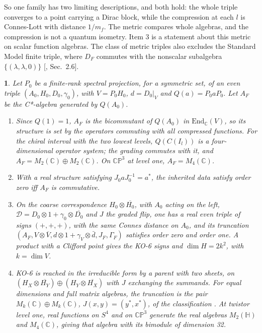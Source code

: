 \documentclass[aps,prd,reprint,onecolumn,nofootinbib,amsmath,amssymb,floatfix]{revtex4-2}
\theoremstyle{plain}
\newcommand{\resultname}{}
\newtheorem*{resultenv}{\resultname}
\newenvironment{result}[1]{\renewcommand{\resultname}{#1}\begin{resultenv}}{\end{resultenv}}
\newcommand{\C}{\mathbb C}
\renewcommand{\H}{\mathbb H}
\begin{document}
So one family has two limiting descriptions, and both hold: the whole triple converges to a point carrying a Dirac block, while the compression at each $l$ is Connes-Lott with distance $1/m_f$. The metric compares whole algebras, and the compression is not a quantum isometry. Item 3 is a statement about this metric on scalar function algebras. The class of metric triples also excludes the Standard Model finite triple, where $D_F$ commutes with the nonscalar subalgebra $\{(\lambda,\lambda,0)\}$ [, Sec.~2.6].

\begin{result}{Proposition H}
Let $P_0$ be a finite-rank spectral projection, for a symmetric set, of an even triple $(A_0,H_0,D_0,\gamma_0)$, with $V=P_0H_0$, $d=D_0|_V$ and $Q(a)=P_0aP_0$. Let $A_F$ be the C*-algebra generated by $Q(A_0)$.
\begin{enumerate}
\item Since $Q(1)=1$, $A_F$ is the bicommutant of $Q(A_0)$ in $\mathrm{End}_\C(V)$, so its structure is set by the operators commuting with all compressed functions. For the chiral interval with the two lowest levels, $Q(C(I_l))$ is a four-dimensional operator system; the grading commutes with it, and $A_F=M_2(\C)\oplus M_2(\C)$. On $\mathbb{CP}^3$ at level one, $A_F=M_4(\C)$.
\item With a real structure satisfying $J_0aJ_0^{-1}=a^*$, the inherited data satisfy order zero iff $A_F$ is commutative.
\item On the coarse correspondence $H_0\otimes\overline{H_0}$, with $A_0$ acting on the left, $\mathcal D=D_0\otimes1+\gamma_0\otimes\overline{D_0}$ and $J$ the graded flip, one has a real even triple of signs $(+,+,+)$, with the same Connes distance on $A_0$, and its truncation $(A_F,V\otimes\overline V,d\otimes1+\gamma_V\otimes\bar d,J_F,\Gamma_F)$ satisfies order zero and order one. A product with a Clifford point gives the KO-6 signs and $\dim H=2k^2$, with $k=\dim V$.
\item KO-6 is reached in the irreducible form by a parent with two sheets, on $(H_X\otimes\overline{H_Y})\oplus(H_Y\otimes\overline{H_X})$ with $J$ exchanging the summands. For equal dimensions and full matrix algebras, the truncation is the pair $M_k(\C)\oplus M_k(\C)$, $J(x,y)=(y^*,x^*)$, of the classification \cite{CC2008}. At twistor level one, real functions on $S^4$ and on $\mathbb{CP}^3$ generate the real algebras $M_2(\H)$ and $M_4(\C)$, giving that algebra with its bimodule of dimension 32.
\end{enumerate}
\end{result}
\end{document}
